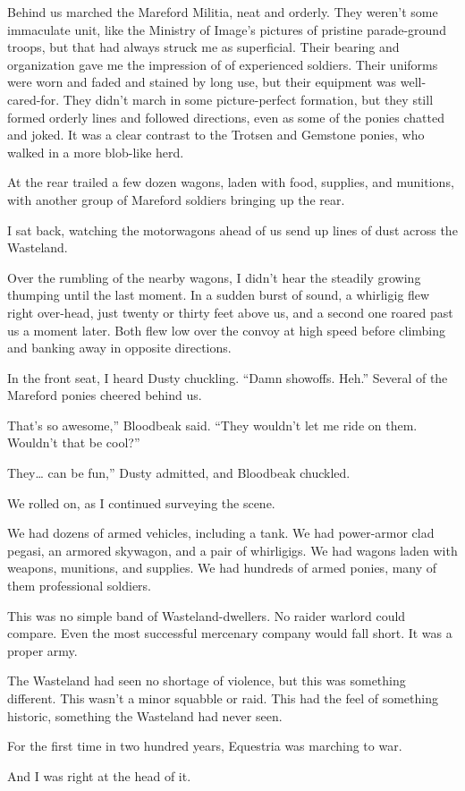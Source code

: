 Behind us marched the Mareford Militia, neat and orderly. They weren’t some immaculate unit, like the Ministry of Image’s pictures of pristine parade-ground troops, but that had always struck me as superficial. Their bearing and organization gave me the impression of of experienced soldiers. Their uniforms were worn and faded and stained by long use, but their equipment was well-cared-for. They didn’t march in some picture-perfect formation, but they still formed orderly lines and followed directions, even as some of the ponies chatted and joked. It was a clear contrast to the Trotsen and Gemstone ponies, who walked in a more blob-like herd.

At the rear trailed a few dozen wagons, laden with food, supplies, and munitions, with another group of Mareford soldiers bringing up the rear.

I sat back, watching the motorwagons ahead of us send up lines of dust across the Wasteland.

Over the rumbling of the nearby wagons, I didn’t hear the steadily growing thumping until the last moment. In a sudden burst of sound, a whirligig flew right over-head, just twenty or thirty feet above us, and a second one roared past us a moment later. Both flew low over the convoy at high speed before climbing and banking away in opposite directions.

In the front seat, I heard Dusty chuckling. “Damn showoffs. Heh.” Several of the Mareford ponies cheered behind us.

\leavevmode{}That’s so awesome,” Bloodbeak said. “They wouldn’t let me ride on them. Wouldn’t that be cool?”

\leavevmode{}They… can be fun,” Dusty admitted, and Bloodbeak chuckled.

We rolled on, as I continued surveying the scene.

We had dozens of armed vehicles, including a tank. We had power-armor clad pegasi, an armored skywagon, and a pair of whirligigs. We had wagons laden with weapons, munitions, and supplies. We had hundreds of armed ponies, many of them professional soldiers.

This was no simple band of Wasteland-dwellers. No raider warlord could compare. Even the most successful mercenary company would fall short. It was a proper army.

The Wasteland had seen no shortage of violence, but this was something different. This wasn’t a minor squabble or raid. This had the feel of something historic, something the Wasteland had never seen.

For the first time in two hundred years, Equestria was marching to war.

And I was right at the head of it.